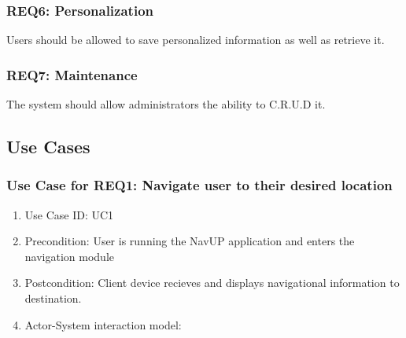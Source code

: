\documentclass[11pt, a4paper]{article}
\begin{document}
		\subsubsection{REQ6: Personalization}
			Users should be allowed to save personalized information as well as retrieve it.
			
		\subsubsection{REQ7: Maintenance}
			The system should allow administrators the ability to C.R.U.D it.
			
	\subsection{Use Cases}
		\subsubsection{Use Case for REQ1: Navigate user to their desired location}
			\begin{enumerate}
			\renewcommand{\labelenumi}{{\textbf{\arabic{enumi}.}}}
			\item Use Case ID: UC1
			\item Precondition: User is running the NavUP application and enters the navigation module
			\item Postcondition: Client device recieves and displays navigational information to destination.
			\item Actor-System interaction model:
			\end{enumerate}
\end{document}

